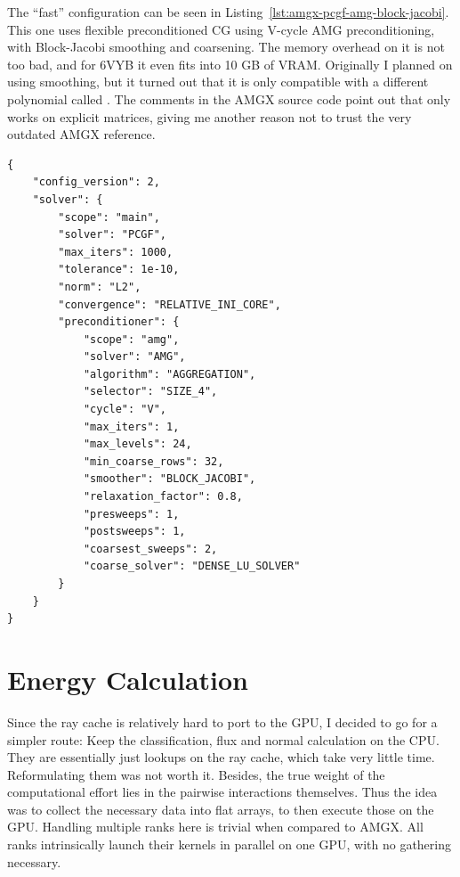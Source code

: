 The ``fast'' configuration can be seen in Listing~\ref{lst:amgx-pcgf-amg-block-jacobi}.
This one uses flexible preconditioned CG using V-cycle AMG preconditioning, with Block-Jacobi smoothing and  coarsening.
The memory overhead on it is not too bad, and for 6VYB it even fits into 10 GB of VRAM.
Originally I planned on using  smoothing, but it turned out that it is only compatible with a different polynomial called .
The comments in the AMGX source code point out that  only works on explicit matrices, giving me another reason not to trust the very outdated AMGX reference.

\begin{lstlisting}[style=configstyle,caption={``Fast'' AMGX configuration: flexible PCG with V-cycle AMG preconditioning, Block-Jacobi smoothing, and \snakecase{SIZE\_4} coarsening.},label={lst:amgx-pcgf-amg-block-jacobi}]
{
    "config_version": 2,
    "solver": {
        "scope": "main",
        "solver": "PCGF",
        "max_iters": 1000,
        "tolerance": 1e-10,
        "norm": "L2",
        "convergence": "RELATIVE_INI_CORE",
        "preconditioner": {
            "scope": "amg",
            "solver": "AMG",
            "algorithm": "AGGREGATION",
            "selector": "SIZE_4",
            "cycle": "V",
            "max_iters": 1,
            "max_levels": 24,
            "min_coarse_rows": 32,
            "smoother": "BLOCK_JACOBI",
            "relaxation_factor": 0.8,
            "presweeps": 1,
            "postsweeps": 1,
            "coarsest_sweeps": 2,
            "coarse_solver": "DENSE_LU_SOLVER"
        }
    }
}
\end{lstlisting}

\section{Energy Calculation}
\label{sec:implementation-energy-calculation}

Since the ray cache is relatively hard to port to the GPU, I decided to go for a simpler route:
Keep the classification, flux and normal calculation on the CPU.
They are essentially just lookups on the ray cache, which take very little time.
Reformulating them was not worth it. 
Besides, the true weight of the computational effort lies in the pairwise interactions themselves.
Thus the idea was to collect the necessary data into flat arrays, to then execute those on the GPU.
Handling multiple ranks here is trivial when compared to AMGX.
All ranks intrinsically launch their kernels in parallel on one GPU, with no gathering necessary.

